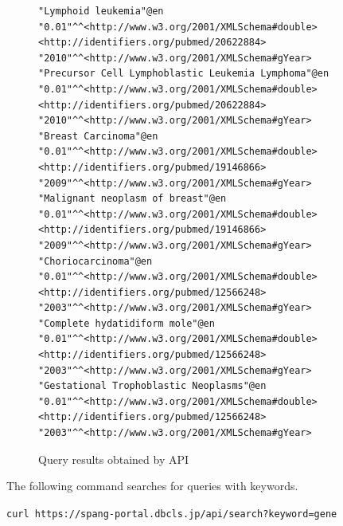 \documentclass[runningheads]{llncs}
\begin{document}
\begin{figure}[!t]
\begin{scriptsize}
\begin{verbatim}
"Lymphoid leukemia"@en	"0.01"^^<http://www.w3.org/2001/XMLSchema#double>	<http://identifiers.org/pubmed/20622884>	"2010"^^<http://www.w3.org/2001/XMLSchema#gYear>
"Precursor Cell Lymphoblastic Leukemia Lymphoma"@en	"0.01"^^<http://www.w3.org/2001/XMLSchema#double>	<http://identifiers.org/pubmed/20622884>	"2010"^^<http://www.w3.org/2001/XMLSchema#gYear>
"Breast Carcinoma"@en	"0.01"^^<http://www.w3.org/2001/XMLSchema#double>	<http://identifiers.org/pubmed/19146866>	"2009"^^<http://www.w3.org/2001/XMLSchema#gYear>
"Malignant neoplasm of breast"@en	"0.01"^^<http://www.w3.org/2001/XMLSchema#double>	<http://identifiers.org/pubmed/19146866>	"2009"^^<http://www.w3.org/2001/XMLSchema#gYear>
"Choriocarcinoma"@en	"0.01"^^<http://www.w3.org/2001/XMLSchema#double>	<http://identifiers.org/pubmed/12566248>	"2003"^^<http://www.w3.org/2001/XMLSchema#gYear>
"Complete hydatidiform mole"@en	"0.01"^^<http://www.w3.org/2001/XMLSchema#double>	<http://identifiers.org/pubmed/12566248>	"2003"^^<http://www.w3.org/2001/XMLSchema#gYear>
"Gestational Trophoblastic Neoplasms"@en	"0.01"^^<http://www.w3.org/2001/XMLSchema#double>	<http://identifiers.org/pubmed/12566248>	"2003"^^<http://www.w3.org/2001/XMLSchema#gYear>
\end{verbatim}
\end{scriptsize}
\caption{Query results obtained by API}
\label{fig:example-rdf}
\end{figure}


The following command searches for queries with keywords.

\texttt{curl https://spang-portal.dbcls.jp/api/search?keyword=gene}
\end{document}
